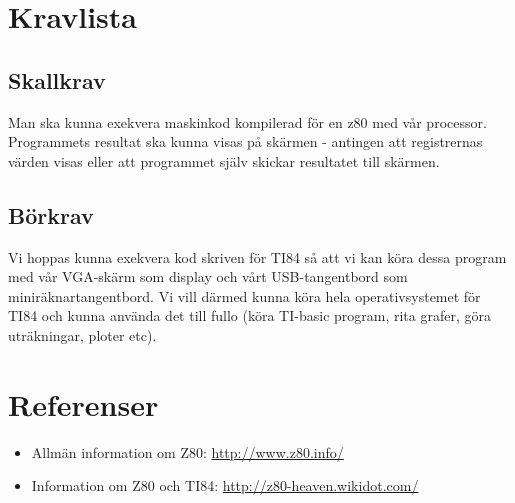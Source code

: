 \documentclass[12pt]{article}
\begin{document}
\section{Kravlista}
\subsection{Skallkrav}
    Man ska kunna exekvera maskinkod kompilerad för en z80 med vår processor.
    Programmets resultat ska kunna visas på skärmen - antingen att registrernas
    värden visas eller att programmet själv skickar resultatet till skärmen.

\subsection{Börkrav}
    Vi hoppas kunna exekvera kod skriven för TI84 så att vi kan köra dessa
    program med vår VGA-skärm som display och vårt USB-tangentbord som
    miniräknartangentbord. Vi vill därmed kunna köra hela operativsystemet för
    TI84 och kunna använda det till fullo (köra TI-basic program, rita grafer,
    göra uträkningar, ploter etc).

\section{Referenser}
\begin{itemize}
    \item Allmän information om Z80: \url{http://www.z80.info/}
    \item Information om Z80 och TI84: \url{http://z80-heaven.wikidot.com/}
\end{itemize}
\end{document}
